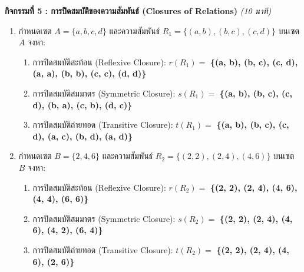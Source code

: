 \documentclass[a4paper,12pt]{article}
\newcommand{\ans}[1]{\textbf{\color{ans}#1}}
\begin{document}
\noindent\textbf{กิจกรรมที่ 5 : การปิดสมบัติของความสัมพันธ์ (Closures of Relations)} \hfill \textit{(10 นาที)}
\begin{enumerate}[label=\arabic*)]
  \item กำหนดเซต $A = \{a, b, c, d\}$ และความสัมพันธ์ $R_1 = \{(a, b), (b, c), (c, d)\}$ บนเซต $A$ จงหา:
        \begin{enumerate}[label=(\alph*),itemsep=3pt]
          \item การปิดสมบัติสะท้อน (Reflexive Closure): $r(R_1) =$ \ans{\{(a, b), (b, c), (c, d), (a, a), (b, b), (c, c), (d, d)\}}
          \item การปิดสมบัติสมมาตร (Symmetric Closure): $s(R_1) =$ \ans{\{(a, b), (b, c), (c, d), (b, a), (c, b), (d, c)\}}
          \item การปิดสมบัติถ่ายทอด (Transitive Closure): $t(R_1) =$ \ans{\{(a, b), (b, c), (c, d), (a, c), (b, d), (a, d)\}}
        \end{enumerate}
  \item กำหนดเซต $B = \{2, 4, 6\}$ และความสัมพันธ์ $R_2 = \{(2, 2), (2, 4), (4, 6)\}$ บนเซต $B$ จงหา:
        \begin{enumerate}[label=(\alph*),itemsep=3pt]
          \item การปิดสมบัติสะท้อน (Reflexive Closure): $r(R_2) =$ \ans{\{(2, 2), (2, 4), (4, 6), (4, 4), (6, 6)\}}
          \item การปิดสมบัติสมมาตร (Symmetric Closure): $s(R_2) =$ \ans{\{(2, 2), (2, 4), (4, 6), (4, 2), (6, 4)\}}
          \item การปิดสมบัติถ่ายทอด (Transitive Closure): $t(R_2) =$ \ans{\{(2, 2), (2, 4), (4, 6), (2, 6)\}}
        \end{enumerate}
\end{enumerate}
\end{document}
